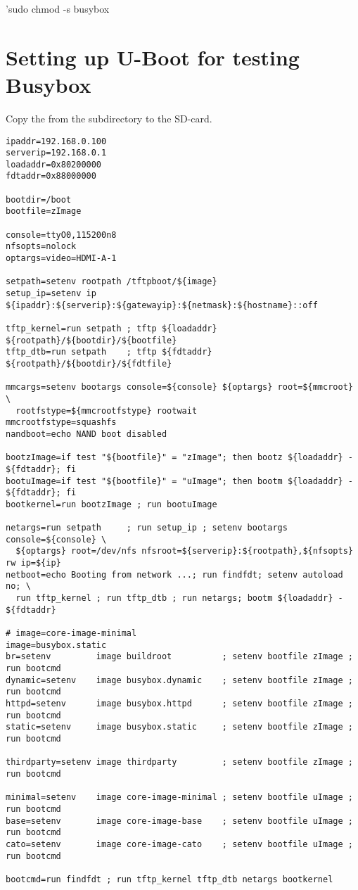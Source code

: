 'sudo chmod -s busybox


\clearpage
\section{Setting up U-Boot for testing Busybox}

Copy the  from the subdirectory to the SD-card.

\begin{verbatim}
ipaddr=192.168.0.100
serverip=192.168.0.1
loadaddr=0x80200000
fdtaddr=0x88000000

bootdir=/boot
bootfile=zImage

console=ttyO0,115200n8
nfsopts=nolock
optargs=video=HDMI-A-1

setpath=setenv rootpath /tftpboot/${image}
setup_ip=setenv ip ${ipaddr}:${serverip}:${gatewayip}:${netmask}:${hostname}::off

tftp_kernel=run setpath ; tftp ${loadaddr} ${rootpath}/${bootdir}/${bootfile}
tftp_dtb=run setpath    ; tftp ${fdtaddr}  ${rootpath}/${bootdir}/${fdtfile}

mmcargs=setenv bootargs console=${console} ${optargs} root=${mmcroot} \
  rootfstype=${mmcrootfstype} rootwait
mmcrootfstype=squashfs
nandboot=echo NAND boot disabled

bootzImage=if test "${bootfile}" = "zImage"; then bootz ${loadaddr} - ${fdtaddr}; fi
bootuImage=if test "${bootfile}" = "uImage"; then bootm ${loadaddr} - ${fdtaddr}; fi
bootkernel=run bootzImage ; run bootuImage

netargs=run setpath     ; run setup_ip ; setenv bootargs console=${console} \
  ${optargs} root=/dev/nfs nfsroot=${serverip}:${rootpath},${nfsopts} rw ip=${ip}
netboot=echo Booting from network ...; run findfdt; setenv autoload no; \
  run tftp_kernel ; run tftp_dtb ; run netargs; bootm ${loadaddr} - ${fdtaddr}

# image=core-image-minimal
image=busybox.static
br=setenv         image buildroot          ; setenv bootfile zImage ; run bootcmd
dynamic=setenv    image busybox.dynamic    ; setenv bootfile zImage ; run bootcmd
httpd=setenv      image busybox.httpd      ; setenv bootfile zImage ; run bootcmd
static=setenv     image busybox.static     ; setenv bootfile zImage ; run bootcmd

thirdparty=setenv image thirdparty         ; setenv bootfile zImage ; run bootcmd

minimal=setenv    image core-image-minimal ; setenv bootfile uImage ; run bootcmd
base=setenv       image core-image-base    ; setenv bootfile uImage ; run bootcmd
cato=setenv       image core-image-cato    ; setenv bootfile uImage ; run bootcmd

bootcmd=run findfdt ; run tftp_kernel tftp_dtb netargs bootkernel
\end{verbatim}

